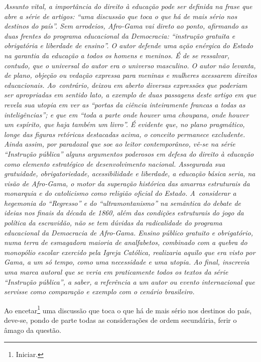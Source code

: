 \begin{didascalia}\itshape
Assunto vital, a importância do direito à educação pode ser definida na
frase que abre a série de artigos: ``uma discussão que toca o que há de
mais sério nos destinos do país''. Sem arrodeios, Afro-Gama vai
direto ao ponto, afirmando as duas frentes do programa educacional da
\textnormal{Democracia}: ``instrução gratuita e obrigatória e liberdade de
ensino''. O autor defende uma ação enérgica do Estado na garantia da
educação a todos os homens e meninos. É de se ressalvar, contudo, que o
universal do autor era o universo masculino. O autor não levanta, de
plano, objeção ou vedação expressa para meninas e mulheres acessarem
direitos educacionais. Ao~contrário, deixou em aberto diversas
expressões que poderiam ser apropriadas em sentido lato, a exemplo de
duas passagens deste artigo em que revela sua utopia em ver as ``portas
da ciência inteiramente francas a todas as inteligências''; e que em
``toda a parte onde houver uma choupana, onde houver um espírito, que
haja também um livro''. É evidente que, no plano pragmático, longe das
figuras retóricas destacadas acima, o conceito permanece excludente.
Ainda assim, por paradoxal que soe ao leitor contemporâneo, vê-se na
série ``Instrução pública'' alguns argumentos poderosos em defesa
do direito à educação como elemento estratégico de desenvolvimento
nacional. Assegurada sua gratuidade, obrigatoriedade, acessibilidade e
liberdade, a educação básica seria, na visão de Afro-Gama, o
motor da superação histórica das amarras estruturais da monarquia e do
catolicismo como religião oficial do Estado. A~considerar a hegemonia
do ``Regresso'' e do ``ultramontanismo'' na semântica do
debate de ideias nos finais da década de 1860, além das condições
estruturais do jogo da política da escravidão, não se tem dúvidas da
radicalidade do programa educacional da \textnormal{Democracia} de
Afro-Gama. Ensino público gratuito e obrigatório, numa terra de
esmagadora maioria de analfabetos, combinado com a quebra do monopólio
escolar exercido pela Igreja Católica, realizaria aquilo que era visto
por Gama, a um só tempo, como uma necessidade e uma utopia.
Ao final, inscrevia uma marca autoral que se veria em
praticamente todos os textos da série ``Instrução pública'', a
saber, a referência a um autor ou evento internacional que servisse como
comparação e exemplo com o cenário brasileiro.
\end{didascalia}



Ao encetar\footnote{Iniciar.} uma discussão que toca o que há de mais
sério nos destinos do país, deve-se, pondo de parte todas as
considerações de ordem secundária, ferir o âmago da questão.

